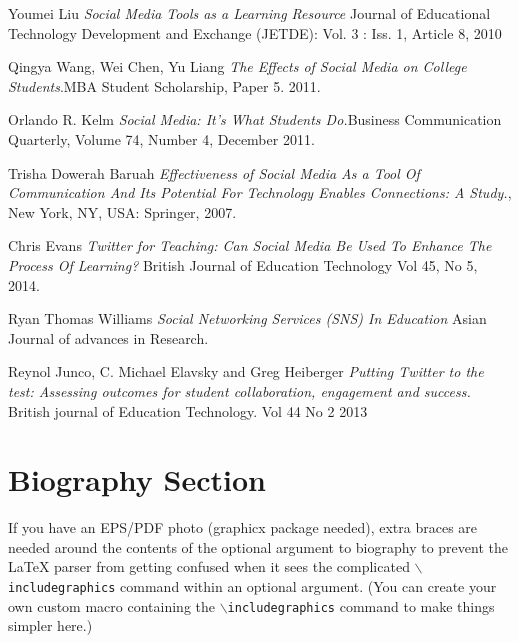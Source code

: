 \documentclass[lettersize,journal]{IEEEtran}
\begin{document}
\begin{thebibliography}{}


	Youmei Liu {\it{Social Media Tools as a Learning Resource}} Journal of Educational Technology Development and Exchange (JETDE): Vol. 3 : Iss. 1, Article 8, 2010

Qingya Wang, Wei Chen, Yu Liang {\it{The Effects of Social Media on College Students}}.MBA Student Scholarship, Paper 5. 2011.

	Orlando R. Kelm {\it{Social Media: It's What Students Do.}}Business Communication Quarterly, Volume 74, Number 4, December 2011.

Trisha Dowerah Baruah {\it{Effectiveness of Social Media As a Tool Of Communication And Its Potential For Technology Enables Connections: A Study.}}, New York, NY, USA: Springer, 2007.

	Chris Evans {\it{Twitter for Teaching: Can Social Media Be Used To Enhance The Process Of Learning?}} British Journal of Education Technology
Vol 45, No 5, 2014.

    Ryan Thomas Williams {\it{Social Networking Services (SNS) In Education}} Asian Journal of advances in Research.

    Reynol Junco, C. Michael Elavsky and Greg Heiberger {\it{Putting Twitter to
        the test: Assessing outcomes for student collaboration, engagement and
        success.}} British journal of Education Technology. Vol 44 No 2 2013

\end{thebibliography}


\newpage

\section{Biography Section}
If you have an EPS/PDF photo (graphicx package needed), extra braces are
 needed around the contents of the optional argument to biography to prevent
 the LaTeX parser from getting confused when it sees the complicated
 $\backslash${\tt{includegraphics}} command within an optional argument. (You can create
 your own custom macro containing the $\backslash${\tt{includegraphics}} command to make things
 simpler here.)
 
\vspace{11pt}
\end{document}
